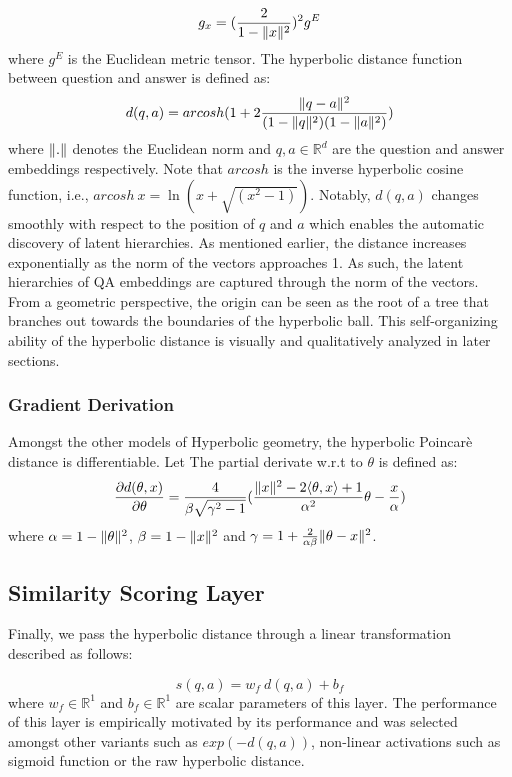 \documentclass[sigconf]{acmart}
\DeclarePairedDelimiter\norm{\lVert}{\rVert}\fancyhead{}
\begin{document}
\begin{equation}
g_x = (\frac{2}{1-\norm{x}^2})^2 g^{E}
\end{equation}
where $g^{E}$ is the Euclidean metric tensor. The hyperbolic distance function between question and answer is defined as:
\begin{equation}
d(q,a) = arcosh (1 + 2 \frac{\norm{q-a}^2}{(1-\norm{q}^2)(1-\norm{a}^2)})
\end{equation}
where $\norm{.}$ denotes the Euclidean norm and $q,a \in \mathbb{R}^{d}$ are the question and answer embeddings respectively. Note that $arcosh$ is the inverse hyperbolic cosine function, i.e., $arcosh \: x = \ln (x + \sqrt{(x^2 -1)})$. Notably, $d(q,a)$ changes smoothly with respect to the position of $q$ and $a$ which enables the automatic discovery of latent hierarchies. As mentioned earlier, the distance increases exponentially as the norm of the vectors approaches 1. As such, the latent hierarchies of QA embeddings are captured through the norm of the vectors. From a geometric perspective, the origin can be seen as the root of a tree that branches out towards the boundaries of the hyperbolic ball. This self-organizing ability of the hyperbolic distance is visually and qualitatively analyzed in later sections. 

\subsubsection{Gradient Derivation}
Amongst the other models of Hyperbolic geometry, the hyperbolic Poincar\`e distance is differentiable. Let  The partial derivate w.r.t to $\theta$ is defined as:
\begin{equation}
\frac{\partial d(\theta, x)}{\partial \theta} 
= \frac{4}{\beta \sqrt{\gamma^2 - 1}} (\frac{\norm{x}^{2} - 2 \langle \theta, x \rangle + 1}{\alpha^2} \theta - \frac{x}{\alpha})
\end{equation}
where $\alpha = 1-\norm{\theta}^2$, $\beta = 1-\norm{x}^2$ and $\gamma = 1 + \frac{2}{\alpha \beta} \norm{\theta - x}^2$. 

\subsection{Similarity Scoring Layer}
Finally, we pass the hyperbolic distance through a linear transformation described as follows:

\begin{equation}
s(q,a) = w_f \: d(q,a) + b_f
\end{equation}
where $w_f \in \mathbb{R}^{1}$ and $b_f \in \mathbb{R}^{1}$ are scalar parameters of this layer. The performance of this layer is empirically motivated by its performance and was selected amongst other variants such as $exp(-d(q,a))$, non-linear activations such as sigmoid function or the raw hyperbolic distance. 
\end{document}
